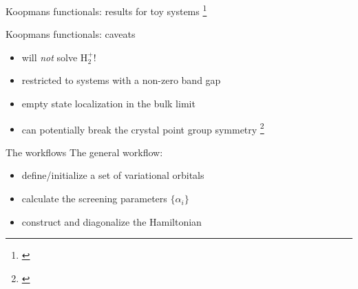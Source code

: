 \documentclass[xcolor=table,aspectratio=169]{beamer}
\newcommand\blfootcite[1]{%
  \begingroup
  \renewcommand\thefootnote{}\footnote{\hspace{-4ex}\cite{#1}}%
  \addtocounter{footnote}{-1}%
  \endgroup
}
\numberwithin{equation}{section}
\begin{document}
\begin{frame}{Koopmans functionals: results for toy systems}
   \blfootcite{Schubert2023}
\end{frame}

\begin{frame}{Koopmans functionals: caveats}

   \begin{itemize}[<+(1)->]
      \item will \emph{not} solve H$_2^+$!
      \item restricted to systems with a non-zero band gap
      \item empty state localization in the bulk limit
      \item can potentially break the crystal point group symmetry\blfootcite{Su2020}
   \end{itemize}
\end{frame}

\begin{frame}{The workflows}
   The general workflow:
   \begin{itemize}
      \item define/initialize a set of variational orbitals
      \item calculate the screening parameters $\{\alpha_i\}$
      \item construct and diagonalize the Hamiltonian
   \end{itemize}
\end{frame}
\end{document}
